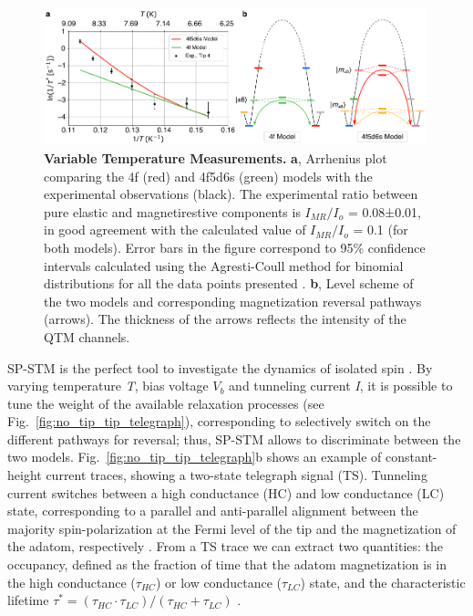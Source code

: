 \documentclass[
reprint,amsmath,amssymb,aps]{revtex4-2}
\begin{document}
\begin{figure}[t!]
\includegraphics[width=0.99\textwidth]{Fig3_new.pdf}
\caption{\textbf{Variable Temperature Measurements.} \textbf{a}, Arrhenius plot comparing the 4f (red) and 4f5d6s (green) models with the experimental observations (black). The experimental ratio between pure elastic and magnetirestive components is $I_{MR}/I_{o}$ = 0.08±0.01, in good agreement with the calculated  value of $I_{MR}/I_{o}$ = 0.1 (for both models). Error bars in the figure correspond to 95$\%$ confidence intervals calculated using the Agresti-Coull method for binomial distributions for all the data points presented \citep{agresti1998}. \textbf{b}, Level scheme of the two models and corresponding magnetization reversal pathways (arrows). The thickness of the arrows reflects the intensity of the QTM channels.
\label{fig:temp} }
\end{figure}

SP-STM is the perfect tool to investigate the dynamics of isolated spin \cite{wiesendanger_ObservationVacuumTunneling_1990,Khajetoorians2013,paul_ControlMillisecondSpin_2017,Natterer2017,Natterer2018}. By varying temperature \textit{T}, bias voltage $V_b$ and tunneling current \textit{I}, it is possible to tune the weight of the available relaxation processes (see Fig.~\ref{fig:no_tip_tip_telegraph}), corresponding to selectively switch on the different pathways for reversal; thus, SP-STM allows to discriminate between the two models. 
Fig.~\ref{fig:no_tip_tip_telegraph}b shows an example of constant-height current traces, showing a two-state
telegraph signal (TS). Tunneling current switches between a high conductance (HC) and low conductance (LC) state, corresponding to a parallel and anti-parallel alignment between the majority spin-polarization at the Fermi level of the tip and the magnetization of the adatom, respectively \cite{delgado2010,paul_ControlMillisecondSpin_2017}. From a TS trace we can extract two quantities: the occupancy, defined as the fraction of time that the adatom magnetization is in the high conductance ($\tau_{HC}$) or low conductance ($\tau_{LC}$) state, and the characteristic lifetime $\tau ^*=(\tau_{HC}  \cdot \tau_{LC})/( \tau_{HC} + \tau_{LC})$ \cite{Khajetoorians2013}. 
\end{document}
